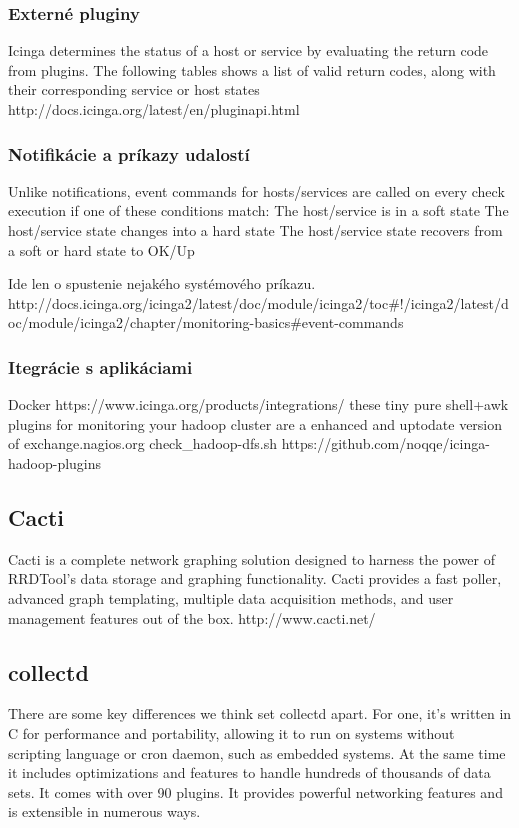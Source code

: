 \documentclass[11pt,final,oneside]{fithesis}
\begin{document}
\subsubsection{Externé pluginy}
Icinga determines the status of a host or service by evaluating the return code from plugins. The following tables shows a list of valid return codes, along with their corresponding service or host states
http://docs.icinga.org/latest/en/pluginapi.html

\subsubsection{Notifikácie a príkazy udalostí}
Unlike notifications, event commands for hosts/services are called on every check execution if one of these conditions match:
The host/service is in a soft state
The host/service state changes into a hard state
The host/service state recovers from a soft or hard state to OK/Up

Ide len o spustenie nejakého systémového príkazu.
http://docs.icinga.org/icinga2/latest/doc/module/icinga2/toc#!/icinga2/latest/doc/module/icinga2/chapter/monitoring-basics#event-commands

\subsubsection{Itegrácie s aplikáciami} 
Docker
https://www.icinga.org/products/integrations/
these tiny pure shell+awk plugins for monitoring your hadoop cluster are a enhanced and uptodate version of exchange.nagios.org check_hadoop-dfs.sh
https://github.com/noqqe/icinga-hadoop-plugins

\subsection{Cacti} 
Cacti is a complete network graphing solution designed to harness the power of RRDTool's data storage and graphing functionality. Cacti provides a fast poller, advanced graph templating, multiple data acquisition methods, and user management features out of the box.
http://www.cacti.net/

\subsection{collectd}
There are some key differences we think set collectd apart. For one, it's written in C for performance and portability, allowing it to run on systems without scripting language or cron daemon, such as embedded systems. 
At the same time it includes optimizations and features to handle hundreds of thousands of data sets. It comes with over 90 plugins. It provides powerful networking features and is extensible in numerous ways. 
\end{document}
